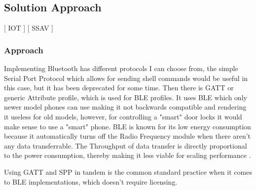 \subsection{Solution Approach}
[ IOT ] [ SSAV ] 
\newline
\subsubsection{\textbf{Approach}}
 Implementing Bluetooth has different protocols I can choose from,  the simple Serial Port Protocol which allows for sending shell commands would be useful in this case, but it has been deprecated for some time. Then there is GATT \cite{BluetoothTechnologyWebsite_2023} or generic Attribute profile, which is used for BLE profiles. It uses BLE which only newer model phones can use making it not backwards compatible and rendering it useless for old models, however, for controlling a "smart" door locks it would make sense to use a "smart" phone. BLE is known for its low energy consumption because it automatically turns off the Radio Frequency module when there aren't any data transferrable. The Throughput of data transfer is directly proportional to the power consumption, thereby making it less viable for scaling performance 
 \cite{Tosi_Taffoni_Santacatterina_Sannino_Formica_2017}.
 
 Using GATT and SPP in tandem is the common standard practice when it comes to BLE implementations, which doesn't require licensing. 
 
